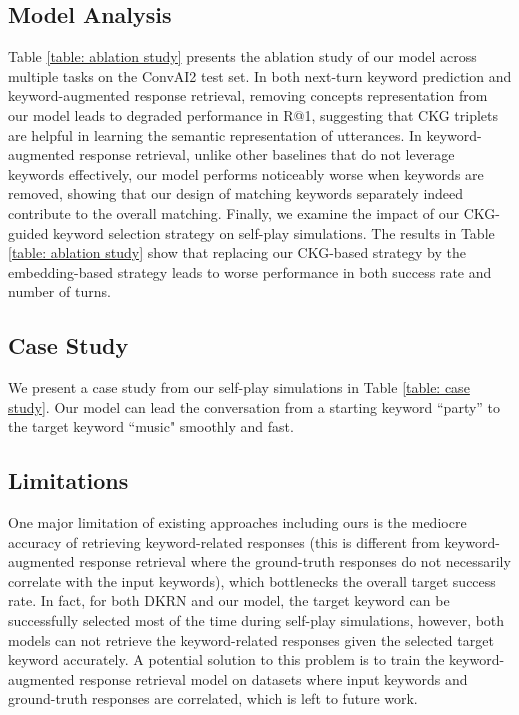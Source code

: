 \documentclass[letterpaper]{article} %
\begin{document}
\vspace{-1.69mm}
\subsection{Model Analysis}
\label{sec: model analysis}

Table \ref{table: ablation study} presents the ablation study of our model across multiple tasks on the ConvAI2 test set. In both next-turn keyword prediction and keyword-augmented response retrieval, removing concepts representation from our model leads to degraded performance in R@1, suggesting that CKG triplets are helpful in learning the semantic representation of utterances. In keyword-augmented response retrieval, unlike other baselines that do not leverage keywords effectively, our model performs noticeably worse when keywords are removed, showing that our design of matching keywords separately indeed contribute to the overall matching. Finally, we examine the impact of our CKG-guided keyword selection strategy on self-play simulations. The results in Table \ref{table: ablation study} show that replacing our CKG-based strategy by the embedding-based strategy \cite{tang2019target, qin2020dynamic} leads to worse performance in both success rate and number of turns.

\subsection{Case Study}
\label{sec: case study}
We present a case study from our self-play simulations in Table \ref{table: case study}. Our model can lead the conversation from a starting keyword ``party'' to the target keyword ``music" smoothly and fast.

\subsection{Limitations}
\label{sec: limitations}
One major limitation of existing approaches including ours is the mediocre accuracy of retrieving keyword-related responses (this is different from keyword-augmented response retrieval where the ground-truth responses do not necessarily correlate with the input keywords), which bottlenecks the overall target success rate. In fact, for both DKRN and our model, the target keyword can be successfully selected most of the time during self-play simulations, however, both models can not retrieve the keyword-related responses given the selected target keyword accurately. A potential solution to this problem is to train the keyword-augmented response retrieval model on datasets where input keywords and ground-truth responses are correlated, which is left to future work.
\end{document}
